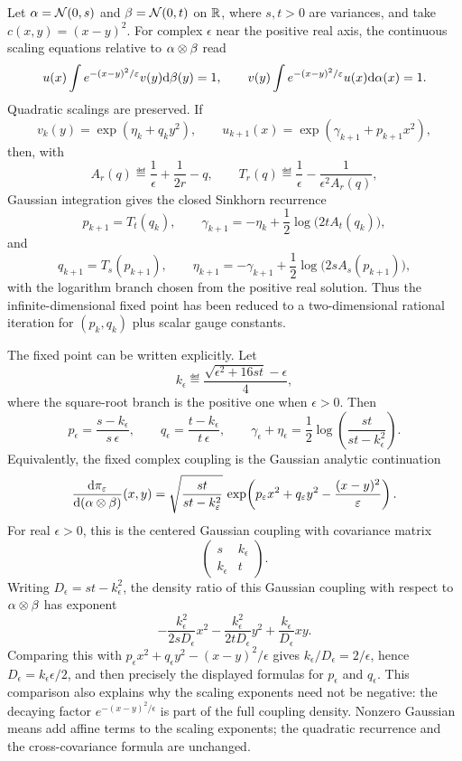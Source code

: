\begin{example}
	Let $\alpha=\mathcal{N}(0,s)$ and $\beta=\mathcal{N}(0,t)$ on $\mathbb{R}$, where $s,t>0$ are variances, and take $c(x,y)=(x-y)^2$. For complex $\epsilon$ near the positive real axis, the continuous scaling equations relative to $\alpha\otimes\beta$ read
	\[
		u(x)\int e^{-(x-y)^2/\varepsilon}v(y)\mathrm{d}\beta(y)=1,
		\qquad
		v(y)\int e^{-(x-y)^2/\varepsilon}u(x)\mathrm{d}\alpha(x)=1 .
	\]
	Quadratic scalings are preserved. If
	\[
		v_k(y)=\exp(\eta_k+q_k y^2),
		\qquad
		u_{k+1}(x)=\exp(\gamma_{k+1}+p_{k+1}x^2),
	\]
	then, with
	\[
		A_r(q)\eqdef \frac1\epsilon+\frac1{2r}-q,
		\qquad
		T_r(q)\eqdef \frac1\epsilon-\frac{1}{\epsilon^2 A_r(q)},
	\]
	Gaussian integration gives the closed Sinkhorn recurrence
	\[
		p_{k+1}=T_t(q_k),
		\qquad
		\gamma_{k+1}=-\eta_k+\frac12\log\bigl(2tA_t(q_k)\bigr),
	\]
	and
	\[
		q_{k+1}=T_s(p_{k+1}),
		\qquad
		\eta_{k+1}=-\gamma_{k+1}+\frac12\log\bigl(2sA_s(p_{k+1})\bigr),
	\]
	with the logarithm branch chosen from the positive real solution. Thus the infinite-dimensional fixed point has been reduced to a two-dimensional rational iteration for $(p_k,q_k)$ plus scalar gauge constants.

	The fixed point can be written explicitly. Let
	\[
		k_\epsilon
		\eqdef
		\frac{\sqrt{\epsilon^2+16st}-\epsilon}{4},
	\]
	where the square-root branch is the positive one when $\epsilon>0$. Then
	\[
		p_\epsilon=\frac{s-k_\epsilon}{s\,\epsilon},
		\qquad
		q_\epsilon=\frac{t-k_\epsilon}{t\,\epsilon},
		\qquad
		\gamma_\epsilon+\eta_\epsilon
		=
		\frac12\log\!\left(\frac{st}{st-k_\epsilon^2}\right).
	\]
	Equivalently, the fixed complex coupling is the Gaussian analytic continuation
	\[
		\frac{\mathrm{d}\pi_\varepsilon}{\mathrm{d}(\alpha\otimes\beta)}(x,y)
		=
		\sqrt{\frac{st}{st-k_\varepsilon^2}}\,
		\exp\!\left(
			p_\varepsilon x^2+q_\varepsilon y^2-\frac{(x-y)^2}{\varepsilon}
		\right).
	\]
	For real $\epsilon>0$, this is the centered Gaussian coupling with covariance matrix
	\[
		\begin{pmatrix}
		s & k_\epsilon\\
		k_\epsilon & t
		\end{pmatrix}.
	\]
	Writing $D_\epsilon=st-k_\epsilon^2$, the density ratio of this Gaussian coupling with respect to $\alpha\otimes\beta$ has exponent
	\[
		-\frac{k_\epsilon^2}{2sD_\epsilon}x^2
		-\frac{k_\epsilon^2}{2tD_\epsilon}y^2
		+\frac{k_\epsilon}{D_\epsilon}xy .
	\]
	Comparing this with $p_\epsilon x^2+q_\epsilon y^2-(x-y)^2/\epsilon$ gives $k_\epsilon/D_\epsilon=2/\epsilon$, hence $D_\epsilon=k_\epsilon\epsilon/2$, and then precisely the displayed formulas for $p_\epsilon$ and $q_\epsilon$. This comparison also explains why the scaling exponents need not be negative: the decaying factor $e^{-(x-y)^2/\epsilon}$ is part of the full coupling density. Nonzero Gaussian means add affine terms to the scaling exponents; the quadratic recurrence and the cross-covariance formula are unchanged.
\end{example}
